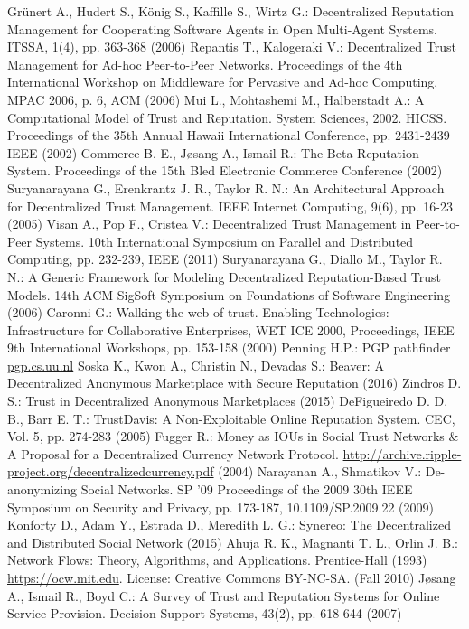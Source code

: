 \begin{thebibliography}{40}
   Gr\"unert A., Hudert S., K\"onig S., Kaffille S., Wirtz G.: Decentralized Reputation Management for Cooperating Software
   Agents in Open Multi-Agent Systems. ITSSA, 1(4), pp. 363-368 (2006)
   Repantis T., Kalogeraki V.: Decentralized Trust Management for Ad-hoc Peer-to-Peer Networks. Proceedings of the 4th
   International Workshop on Middleware for Pervasive and Ad-hoc Computing, MPAC 2006, p. 6, ACM (2006)
   Mui L., Mohtashemi M., Halberstadt A.: A Computational Model of Trust and Reputation. System Sciences, 2002. HICSS.
   Proceedings of the 35th Annual Hawaii International Conference, pp. 2431-2439 IEEE (2002)
   Commerce B. E., J\o{}sang A., Ismail R.: The Beta Reputation System. Proceedings of the 15th Bled Electronic Commerce
   Conference (2002)
   Suryanarayana G., Erenkrantz J. R., Taylor R. N.: An Architectural Approach for Decentralized Trust Management. IEEE
   Internet Computing, 9(6), pp. 16-23 (2005)
   Visan A., Pop F., Cristea V.: Decentralized Trust Management in Peer-to-Peer Systems. 10th International Symposium on
   Parallel and Distributed Computing, pp. 232-239, IEEE (2011)
   Suryanarayana G., Diallo M., Taylor R. N.: A Generic Framework for Modeling Decentralized Reputation-Based Trust Models.
   14th ACM SigSoft Symposium on Foundations of Software Engineering (2006)
   Caronni G.: Walking the web of trust. Enabling Technologies: Infrastructure for Collaborative Enterprises, WET ICE 2000,
   Proceedings, IEEE 9th International Workshops, pp. 153-158 (2000)
   Penning H.P.: PGP pathfinder \url{pgp.cs.uu.nl}
   Soska K., Kwon A., Christin N., Devadas S.: Beaver: A Decentralized Anonymous Marketplace with Secure Reputation (2016)
   Zindros D. S.: Trust in Decentralized Anonymous Marketplaces (2015)
   DeFigueiredo D. D. B., Barr E. T.: TrustDavis: A Non-Exploitable Online Reputation System. CEC, Vol. 5, pp. 274-283
   (2005)
   Fugger R.: Money as IOUs in Social Trust Networks \& A Proposal for a Decentralized Currency Network Protocol.
   \url{http://archive.ripple-project.org/decentralizedcurrency.pdf} (2004)
   Narayanan A., Shmatikov V.: De-anonymizing Social Networks. SP '09 Proceedings of the 2009 30th IEEE Symposium on
   Security and Privacy, pp. 173-187, 10.1109/SP.2009.22 (2009)
   Konforty D., Adam Y., Estrada D., Meredith L. G.: Synereo: The Decentralized and Distributed Social Network (2015)
   Ahuja R. K., Magnanti T. L., Orlin J. B.: Network Flows: Theory, Algorithms, and Applications. Prentice-Hall (1993)
   \url{https://ocw.mit.edu}. License: Creative Commons BY-NC-SA. (Fall 2010)
   J\o{}sang A., Ismail R., Boyd C.: A Survey of Trust and Reputation Systems for Online Service Provision. Decision
   Support Systems, 43(2), pp. 618-644 (2007)
\end{thebibliography}

